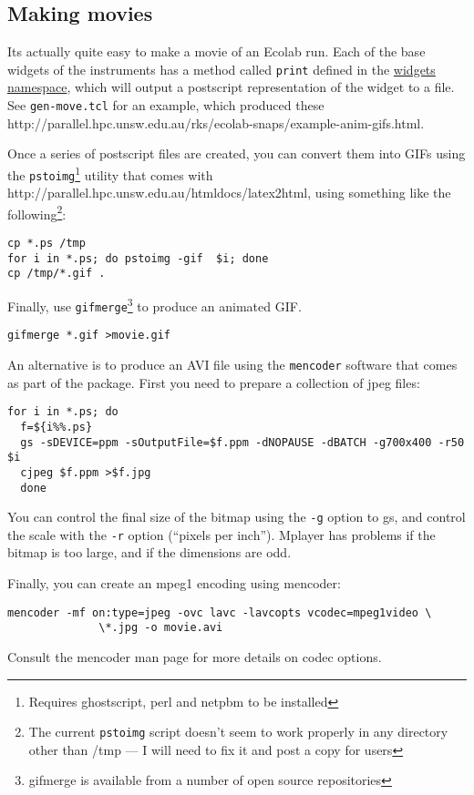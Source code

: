 \subsection{Making movies}

Its actually quite easy to make a movie of an Ecolab run. Each of the
base widgets of the instruments has a method called \verb+print+
defined in the \hyperref{widgets namespace}{widgets namespace (\S}{)}{widgets namespace},
which will output a postscript representation of the widget to a
file. See {\tt gen-move.tcl} for an example,
which produced these 
{http://parallel.hpc.unsw.edu.au/rks/ecolab-snaps/example-anim-gifs.html}.

Once a series of postscript files are created, you can convert them
into GIFs using the {\tt pstoimg}\footnote{Requires
  ghostscript, perl and netpbm to be installed} utility that comes
with 
{http://parallel.hpc.unsw.edu.au/htmldocs/latex2html}, using something
like the following\footnote{The current {\tt pstoimg} script doesn't
  seem to work properly in any directory other than /tmp --- I will
  need to fix it and post a copy for \EcoLab{} users}:
\begin{verbatim}
cp *.ps /tmp
for i in *.ps; do pstoimg -gif  $i; done
cp /tmp/*.gif .
\end{verbatim}


Finally, use {\tt gifmerge}\footnote{gifmerge is
  available from a number of open source repositories} to produce an
animated GIF.
\begin{verbatim}
gifmerge *.gif >movie.gif
\end{verbatim}

An alternative is to produce an AVI file using the \verb+mencoder+
software that comes as part of the
package. First you need to prepare a collection of jpeg files:
\begin{verbatim}
for i in *.ps; do 
  f=${i%%.ps}
  gs -sDEVICE=ppm -sOutputFile=$f.ppm -dNOPAUSE -dBATCH -g700x400 -r50  $i
  cjpeg $f.ppm >$f.jpg
  done
\end{verbatim}
You can control the final size of the bitmap using the \verb+-g+
option to gs, and control the scale with the \verb+-r+ option
(``pixels per inch''). Mplayer has problems if the bitmap is too
large, and if the dimensions are odd.

Finally, you can create an mpeg1 encoding using mencoder:
\begin{verbatim}
mencoder -mf on:type=jpeg -ovc lavc -lavcopts vcodec=mpeg1video \
              \*.jpg -o movie.avi
\end{verbatim}
Consult the mencoder man page for more details on codec options.

